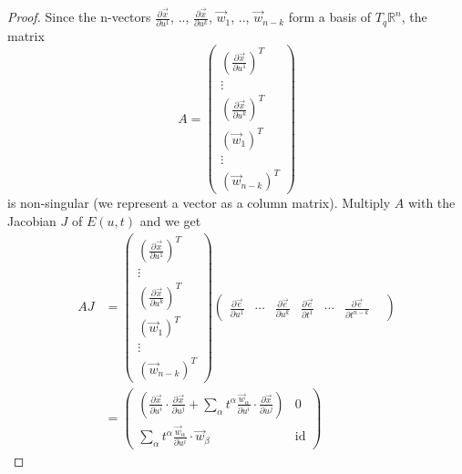 \documentclass[12pt]{article}
\DeclareMathOperator{\id}{id}
\newcommand{\RR}{\mathbb{R}}      %
\newcommand{\vect}[1]{\vec{#1}}
\begin{document}
\begin{proof}
  Since the n-vectors $\frac{\partial \vect{x}}{\partial u^1}$, ..,
  $\frac{\partial \vect{x}}{\partial u^k}$, $\vect{w}_1$, .., $\vect{w}_{n-k}$
  form a basis of $T_q\RR^n$, the matrix
  \begin{equation}
    A = \left(
      \begin{matrix}
        \left(\frac{\partial \vect{x}}{\partial u^1}\right)^T \\
        \vdots \\
        \left(\frac{\partial \vect{x}}{\partial u^k}\right)^T \\
        \left(\vect{w}_1\right)^T \\
        \vdots \\
        \left(\vect{w}_{n-k}\right)^T
      \end{matrix}
    \right)
  \end{equation}
  is non-singular (we represent a vector as a column matrix). Multiply $A$ with
  the Jacobian $J$ of $E(u, t)$ and we get
  \begin{equation}
    \begin{aligned}
      AJ &= 
      \left(
        \begin{matrix}
          \left(\frac{\partial \vect{x}}{\partial u^1}\right)^T \\
          \vdots \\
          \left(\frac{\partial \vect{x}}{\partial u^k}\right)^T \\
          \left(\vect{w}_1\right)^T \\
            \vdots \\
          \left(\vect{w}_{n-k}\right)^T
        \end{matrix}
      \right)
      \left(
        \begin{matrix}
          \frac{\partial \vect{e}}{\partial u^1} &
          \cdots &
          \frac{\partial \vect{e}}{\partial u^k} &
          \frac{\partial \vect{e}}{\partial t^1} &
          \cdots &
          \frac{\partial \vect{e}}{\partial t^{n-k}} &
        \end{matrix}
      \right) \\
      &=
      \left(
        \begin{matrix}
          \left( \frac{\partial \vect{x}}{\partial u^i} \cdot \frac{\partial
              \vec{x}}{\partial u^j} + \sum_{\alpha}
            t^{\alpha}\frac{\vec{w}_{\alpha}}{\partial u^i} \cdot \frac{\partial
              \vect{x}}{\partial u^j} \right) & 0
          \\
          \sum_{\alpha} t^{\alpha}\frac{\vect{w}_{\alpha}}{\partial u^i} \cdot
          \vect{w}_{\beta} & \id
        \end{matrix}
      \right)
    \end{aligned}
  \end{equation}
  

\end{proof}
\end{document}
